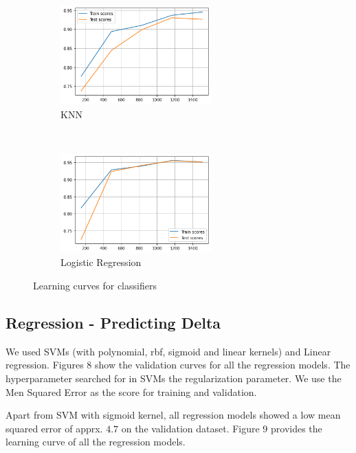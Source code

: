 \documentclass{article}
\begin{document}
\begin{figure}[htb!]
    \begin{subfigure}[t]{0.5\textwidth}
        \centering
        \includegraphics[height=1.5in]{img/momentum-classification/learning-curves/knn}
        \caption{KNN}
    \end{subfigure}%
    ~
    \begin{subfigure}[t]{0.5\textwidth}
        \centering
        \includegraphics[height=1.5in]{img/momentum-classification/learning-curves/log-regression}
        \caption{Logistic Regression}
    \end{subfigure}

    \caption{Learning curves for classifiers}
\end{figure}

\clearpage

\subsection{Regression - Predicting Delta}
We used SVMs (with polynomial, rbf, sigmoid and linear kernels) and Linear regression. Figures 8 show the validation curves for all the regression models. The hyperparameter searched for in SVMs the regularization parameter. We use the Men Squared Error as the score for training and validation.

Apart from SVM with sigmoid kernel, all regression models showed a low mean squared error of apprx. $4.7$ on the validation dataset. Figure 9 provides the learning curve of all the regression models.
\end{document}
